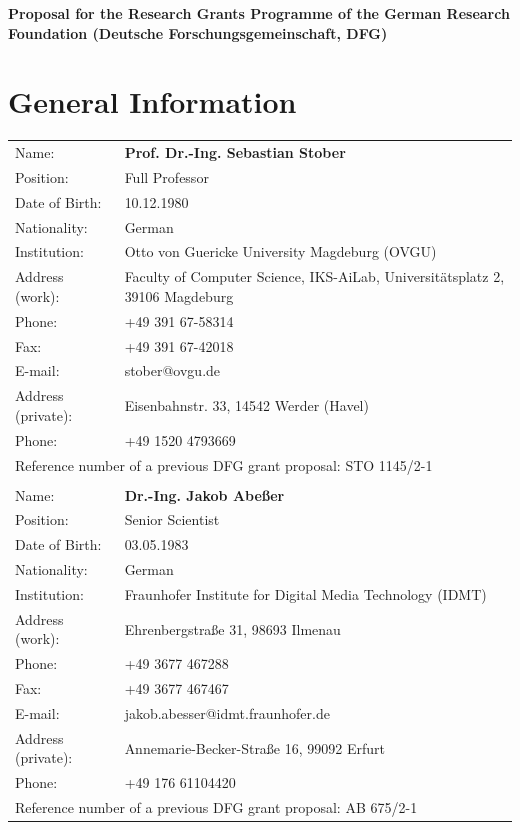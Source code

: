 \documentclass[11pt]{article}
\begin{document}
\begin{center}

{\large \textbf{Proposal for the Research Grants Programme of the
German Research Foundation (Deutsche Forschungsgemeinschaft, DFG)}}
    
\end{center}

\vspace{.5cm}


\section*{General Information}

\begin{tabular}[t]{ll} 
Name: & \textbf{Prof. Dr.-Ing. Sebastian Stober} \\
Position: &  Full Professor\\
Date of Birth: &  10.12.1980\\
Nationality: &  German\\
Institution: &  Otto von Guericke University Magdeburg (OVGU)\\
Address (work): & Faculty of Computer Science, IKS-AiLab, Universitätsplatz 2, 39106 Magdeburg\\
Phone: & +49 391 67-58314\\
Fax: &  +49 391 67-42018\\
E-mail: & stober@ovgu.de\\
Address (private): & Eisenbahnstr. 33, 14542 Werder (Havel)\\
Phone: & +49 1520 4793669\\
\multicolumn{2}{l}{Reference number of a previous DFG grant proposal: STO 1145/2-1}\\
& \\
Name: & \textbf{Dr.-Ing. Jakob Abe{\ss}er} \\
Position: & Senior Scientist \\
Date of Birth: & 03.05.1983 \\
Nationality: & German \\
Institution: & Fraunhofer Institute for Digital Media Technology (IDMT) \\
Address (work): & Ehrenbergstraße 31, 98693 Ilmenau\\
Phone: & +49 3677 467288\\
Fax: & +49 3677 467467 \\
E-mail: & jakob.abesser@idmt.fraunhofer.de\\
Address (private): & Annemarie-Becker-Straße 16, 99092 Erfurt\\
Phone: & +49 176 61104420\\
\multicolumn{2}{l}{Reference number of a previous DFG grant proposal: AB 675/2-1}\\


\end{tabular}
\end{document}
